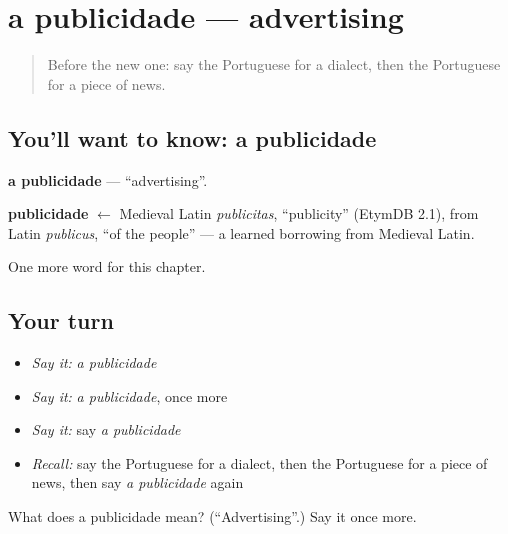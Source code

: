 \section[a publicidade]{a publicidade — advertising}

\label{lesson:PT-C245-publicidade}



\begin{quote}
Before the new one: say the Portuguese for a dialect, then the Portuguese for a piece of news.
\end{quote}

\subsection*{You'll want to know: a publicidade}
\textbf{a publicidade} — \textquotedblleft{}advertising\textquotedblright{}.

\begin{cousinweb}
\textbf{publicidade} $\leftarrow$ Medieval Latin \emph{publicitas}, \textquotedblleft{}publicity\textquotedblright{} (EtymDB 2.1), from Latin \emph{publicus}, \textquotedblleft{}of the people\textquotedblright{} — a learned borrowing from Medieval Latin.
\end{cousinweb}

\begin{grammarlens}[title={What you've built}]
One more word for this chapter.
\end{grammarlens}

\subsection*{Your turn}
\begin{itemize}
\raggedright
  \item \emph{Say it:} \emph{a publicidade}
  \item \emph{Say it:} \emph{a publicidade}, once more
  \item \emph{Say it:} say \emph{a publicidade}
  \item \emph{Recall:} say the Portuguese for a dialect, then the Portuguese for a piece of news, then say \emph{a publicidade} again
\end{itemize}

\begin{tcolorbox}[breakable,colback=teal!4,colframe=teal!35!black,title={Before you move on}]
What does a publicidade mean? (\textquotedblleft{}Advertising\textquotedblright{}.) Say it once more.
\end{tcolorbox}
